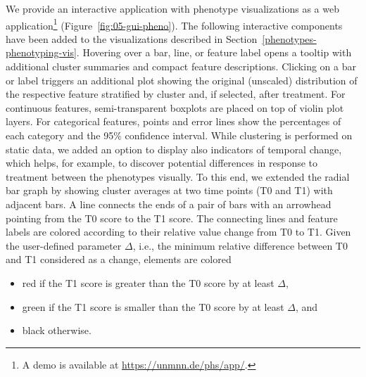 \documentclass[
  oneside]{book}
\providecommand{\tightlist}{%
  \setlength{\itemsep}{0pt}\setlength{\parskip}{0pt}}
\begin{document}
We provide an interactive application with phenotype visualizations as a web application\footnote{A demo is available at \url{https://unmnn.de/phs/app/}.} (Figure~\ref{fig:05-gui-pheno}).
The following interactive components have been added to the visualizations described in Section~\ref{phenotypes-phenotyping-vis}.
Hovering over a bar, line, or feature label opens a tooltip with additional cluster summaries and compact feature descriptions.
Clicking on a bar or label triggers an additional plot showing the original (unscaled) distribution of the respective feature stratified by cluster and, if selected, after treatment.
For continuous features, semi-transparent boxplots are placed on top of violin plot \autocite{Hintze:Violin1998} layers.
For categorical features, points and error lines show the percentages of each category and the 95\% confidence interval.
While clustering is performed on static data, we added an option to display also indicators of temporal change, which helps, for example, to discover potential differences in response to treatment between the phenotypes visually.
To this end, we extended the radial bar graph by showing cluster averages
at two time points (T0 and T1) with adjacent bars.
A line connects the ends of a pair of bars with an arrowhead pointing from the T0 score to the T1 score.
The connecting lines and feature labels are colored according to their relative value change from T0 to T1.
Given the user-defined parameter \(\Delta\), i.e., the minimum relative difference between T0 and T1 considered as a change, elements are colored

\begin{itemize}
\tightlist
\item
  red if the T1 score is greater than the T0 score by at least \(\Delta\),
\item
  green if the T1 score is smaller than the T0 score by at least \(\Delta\), and
\item
  black otherwise.
\end{itemize}
\end{document}
